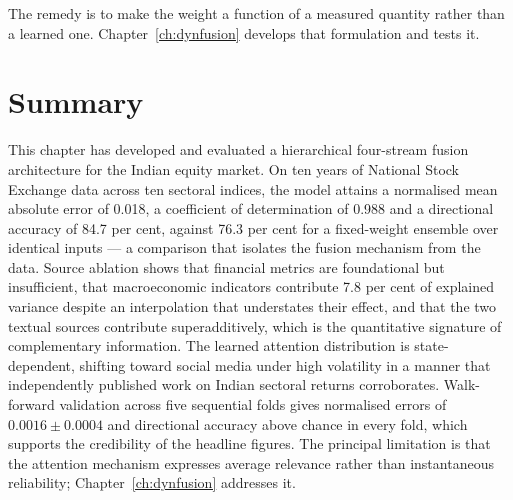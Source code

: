 The remedy is to make the weight a function of a measured quantity rather than a learned one.
Chapter~\ref{ch:dynfusion} develops that formulation and tests it.

\section{Summary}

This chapter has developed and evaluated a hierarchical four-stream fusion architecture for the
Indian equity market. On ten years of National Stock Exchange data across ten sectoral indices,
the model attains a normalised mean absolute error of 0.018, a coefficient of determination of
0.988 and a directional accuracy of 84.7 per cent, against 76.3 per cent for a fixed-weight
ensemble over identical inputs --- a comparison that isolates the fusion mechanism from the data.
Source ablation shows that financial metrics are foundational but insufficient, that
macroeconomic indicators contribute 7.8 per cent of explained variance despite an interpolation
that understates their effect, and that the two textual sources contribute superadditively, which
is the quantitative signature of complementary information. The learned attention distribution is
state-dependent, shifting toward social media under high volatility in a manner that
independently published work on Indian sectoral returns corroborates. Walk-forward validation
across five sequential folds gives normalised errors of $0.0016 \pm 0.0004$ and directional
accuracy above chance in every fold, which supports the credibility of the headline figures. The
principal limitation is that the attention mechanism expresses average relevance rather than
instantaneous reliability; Chapter~\ref{ch:dynfusion} addresses it.
